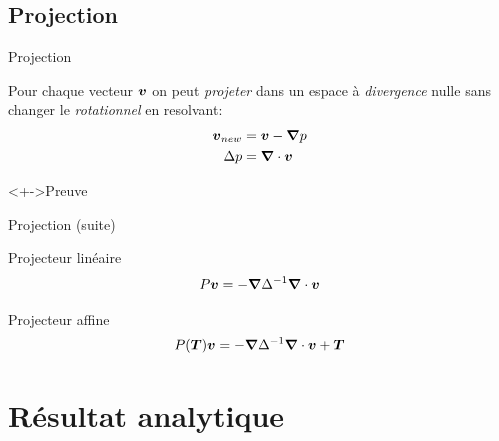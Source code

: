\subsection{Projection}
\begin{frame}{Projection}
 
 \begin{property}
 Pour chaque vecteur ${\boldsymbol {v}}$ on peut \emph{projeter} dans un espace à \emph{divergence} nulle sans changer le \emph{rotationnel} en resolvant:
  \begin{align*}
  {\boldsymbol {v}}_{new}&={\boldsymbol {v}}-{\boldsymbol {\nabla}} p\\
  \Delta p&={\boldsymbol {\nabla}} \cdot {\boldsymbol {v}}
  \end{align*}
\begin{block}<+->{Preuve}
 \end{block}
 \end{property}
 
\end{frame}

\begin{frame}[<+->]{Projection (suite)}
  \begin{definition}{Projecteur linéaire}
  \begin{equation*}
   P{\boldsymbol {v}}=-{\boldsymbol {\nabla}}\Delta^{-1}{\boldsymbol {\nabla}}\cdot {\boldsymbol {v}}
  \end{equation*}
 \end{definition}
 
  \begin{definition}{Projecteur affine}
  \begin{equation*}
   P({\boldsymbol {T}}){\boldsymbol {v}}=-{\boldsymbol {\nabla}}\Delta^{-1}{\boldsymbol {\nabla}}\cdot {\boldsymbol {v}}+{\boldsymbol {T}}
  \end{equation*}
 \end{definition}
\end{frame}


\section{Résultat analytique}
